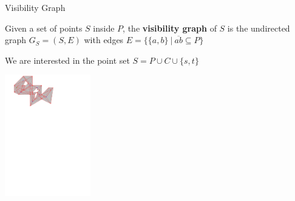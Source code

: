 \begin{frame}{Visibility Graph}

\vspace{-1em}
\begin{mydef}{}
Given a set of points $S$ inside $P$, the \textbf{visibility graph}
of $S$ is the undirected graph $G_S = (S, E)$ with edges
$E = \{\{a, b\}\ | \  \overline{ab} \subseteq P \}$
\end{mydef}

We are interested in the point set $S = P \cup C \cup \{s, t\}$
\begin{center}
\includegraphics[height=150pt]{graphics/visibility1.pdf}
\end{center}

\end{frame}

